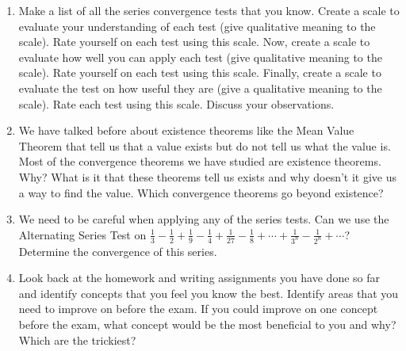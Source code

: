 \begin{enumerate}
\item Make a list of all the series convergence tests that you know.  Create a scale to evaluate your understanding of each test (give qualitative meaning to the scale). Rate yourself on each test using this scale.  Now, create a scale to evaluate how well you can apply each test (give qualitative meaning to the scale).  Rate yourself on each test using this scale.  Finally, create a scale to evaluate the test on how useful they are (give a qualitative meaning to the scale).  Rate each test using this scale.  Discuss your observations.

\item We have talked before about existence theorems like the Mean Value Theorem that tell us that a value exists but do not tell us what the value is.  Most of the convergence theorems we have studied are existence theorems.  Why?  What is it that these theorems tell us exists and why doesn't it give us a way to find the value.  Which convergence theorems go beyond existence?

\item We need to be careful when applying any of the series tests.  Can we use the Alternating Series Test on $
\frac{1}{3} - \frac{1}{2} + \frac{1}{9} - \frac{1}{4} + \frac{1}{{27}} - \frac{1}{8} +  \cdots  + \frac{1}{{3^n }} - \frac{1}{{2^n }} +  \cdots $?  Determine the convergence of this series.   \cite{FWG}

\item Look back at the homework and writing assignments you have done so far and identify concepts that you feel you know the best.  Identify areas that you need to improve on before the exam.  If you could improve on one concept before the exam, what concept would be the most beneficial to you and why? Which are the trickiest?

\end{enumerate}


